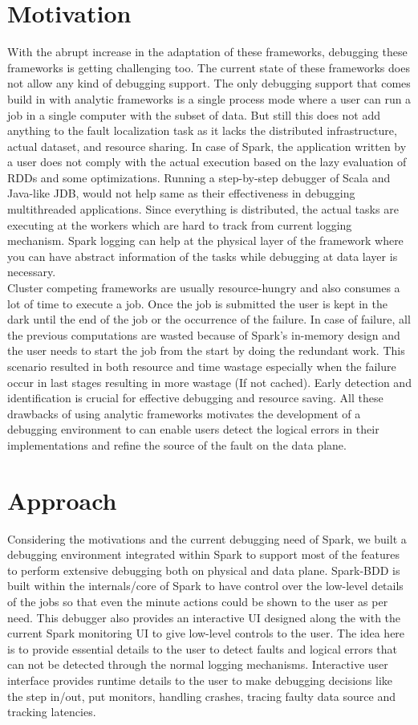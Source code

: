 \documentclass{acm_proc_article-sp}
\begin{document}
\section{Motivation}
With the abrupt increase in the adaptation of these frameworks, debugging these frameworks is getting challenging too. The current state of these frameworks does not allow any kind of debugging support. The only debugging support that comes build in with analytic frameworks is a single process mode where a user can run a job in a single computer with the subset of data. But still this does not add anything to the fault localization task as it lacks the distributed infrastructure, actual dataset, and resource sharing. In case of Spark, the application written by a user does not comply with the actual execution based on the lazy evaluation of RDDs and some optimizations. Running a step-by-step debugger of Scala and Java-like JDB, would not help same as their effectiveness in debugging multithreaded applications. Since everything is distributed, the actual tasks are executing at the workers which are hard to track from current logging mechanism. Spark logging can help at the physical layer of the framework where you can have abstract information of the tasks while debugging at data layer is necessary.\\
Cluster competing frameworks are usually resource-hungry and also consumes a lot of time to execute a job. Once the job is submitted the user is kept in the dark until the end of the job or the occurrence of the failure. In case of failure, all the previous computations are wasted because of Spark's in-memory design and the user needs to start the job from the start by doing the redundant work. This scenario resulted in both resource and time wastage especially when the failure occur in last stages resulting in more wastage (If not cached).  Early detection and identification is crucial for effective debugging and resource saving. All these drawbacks of using analytic frameworks motivates the development of a debugging environment to can enable users detect the logical errors in their implementations and refine the source of the fault on the data plane.


\section{Approach}
Considering the motivations and the current debugging need of Spark, we built a debugging environment integrated within Spark to support most of the features to perform extensive debugging both on physical and data plane. Spark-BDD is built within the internals/core of Spark to have control over the low-level details of the jobs so that even the minute actions could be shown to the user as per need. This debugger also provides an interactive UI designed along the with the current Spark monitoring UI to give low-level controls to the user.  The idea here is to provide essential details to the user to detect faults and logical errors that can not be detected through the normal logging mechanisms. Interactive user interface provides runtime details to the user to make debugging decisions like the step in/out, put monitors, handling crashes, tracing faulty data source and tracking latencies.
\end{document}
